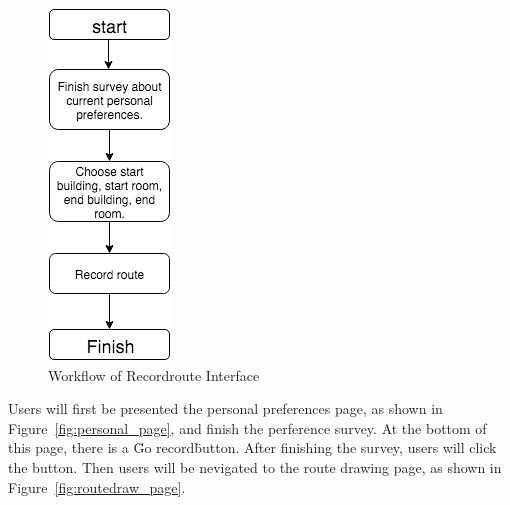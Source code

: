 \documentclass{sigchi}
\begin{document}
\begin{figure}[!h]
\centering
\includegraphics[width=0.6\columnwidth]{pics/label-ui-flow.png}
\caption{Workflow of Recordroute Interface}
\label{fig:label-ui-flow}
\end{figure}

Users will first be presented the personal preferences page, as shown in Figure~\ref{fig:personal_page}, and finish the perference survey. At the bottom of this page, there is a \"Go record\" button. After finishing the survey, users will click the button. Then users will be nevigated to the route drawing page, as shown in Figure~\ref{fig:routedraw_page}.
\end{document}
